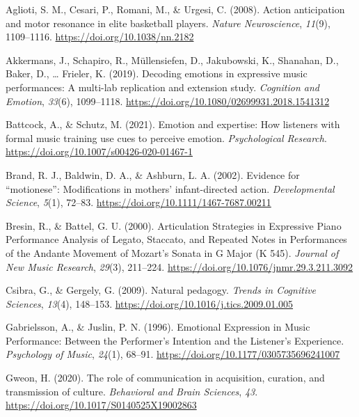 \documentclass[
  man,floatsintext]{apa6}
\newlength{\cslhangindent}
\newlength{\cslentryspacingunit} %
\newenvironment{CSLReferences}[2] %
 {%
  \setlength{\parindent}{0pt}
  \ifodd #1
  \let\oldpar\par
  \def\par{\hangindent=\cslhangindent\oldpar}
  \fi
  \setlength{\parskip}{#2\cslentryspacingunit}
 }%
 {}
\begin{document}
\hypertarget{refs}{}
\begin{CSLReferences}{1}{0}
\leavevmode{}%
Aglioti, S. M., Cesari, P., Romani, M., \& Urgesi, C. (2008). Action anticipation and motor resonance in elite basketball players. \emph{Nature Neuroscience}, \emph{11}(9), 1109--1116. \url{https://doi.org/10.1038/nn.2182}

\leavevmode{}%
Akkermans, J., Schapiro, R., Müllensiefen, D., Jakubowski, K., Shanahan, D., Baker, D., \ldots{} Frieler, K. (2019). Decoding emotions in expressive music performances: {A} multi-lab replication and extension study. \emph{Cognition and Emotion}, \emph{33}(6), 1099--1118. \url{https://doi.org/10.1080/02699931.2018.1541312}

\leavevmode{}%
Battcock, A., \& Schutz, M. (2021). Emotion and expertise: How listeners with formal music training use cues to perceive emotion. \emph{Psychological Research}. \url{https://doi.org/10.1007/s00426-020-01467-1}

\leavevmode{}%
Brand, R. J., Baldwin, D. A., \& Ashburn, L. A. (2002). Evidence for {``motionese''}: Modifications in mothers' infant-directed action. \emph{Developmental Science}, \emph{5}(1), 72--83. \url{https://doi.org/10.1111/1467-7687.00211}

\leavevmode{}%
Bresin, R., \& Battel, G. U. (2000). Articulation {Strategies} in {Expressive Piano Performance Analysis} of {Legato}, {Staccato}, and {Repeated Notes} in {Performances} of the {Andante Movement} of {Mozart}'s {Sonata} in {G Major} ({K} 545). \emph{Journal of New Music Research}, \emph{29}(3), 211--224. \url{https://doi.org/10.1076/jnmr.29.3.211.3092}

\leavevmode{}%
Csibra, G., \& Gergely, G. (2009). Natural pedagogy. \emph{Trends in Cognitive Sciences}, \emph{13}(4), 148--153. \url{https://doi.org/10.1016/j.tics.2009.01.005}

\leavevmode{}%
Gabrielsson, A., \& Juslin, P. N. (1996). Emotional {Expression} in {Music Performance}: {Between} the {Performer}'s {Intention} and the {Listener}'s {Experience}. \emph{Psychology of Music}, \emph{24}(1), 68--91. \url{https://doi.org/10.1177/0305735696241007}

\leavevmode{}%
Gweon, H. (2020). The role of communication in acquisition, curation, and transmission of culture. \emph{Behavioral and Brain Sciences}, \emph{43}. \url{https://doi.org/10.1017/S0140525X19002863}


\end{CSLReferences}
\end{document}
